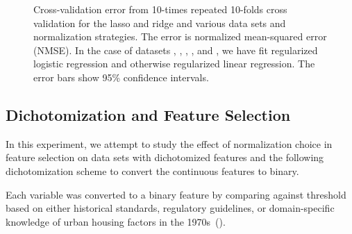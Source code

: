 \begin{figure*}[htpb]
  \centering
  \caption{%
    Cross-validation error from 10-times repeated 10-folds cross validation for the lasso and ridge
    and various data sets and normalization strategies. The error is normalized mean-squared
    error (NMSE). In the case of datasets , , , ,
    and , we have fit regularized logistic regression and
    otherwise regularized linear regression. The error bars show 95\% confidence intervals.
  }
  \label{fig:method-comparison}
\end{figure*}

\subsection{Dichotomization and Feature Selection}
\label{sec:dichotomization}

In this experiment, we attempt to study the effect of normalization choice in feature
selection on data sets with dichotomized features and the following dichotomization scheme
to convert the continuous features to binary.

Each variable was converted to a binary feature by comparing against threshold based on
either historical standards, regulatory guidelines, or domain-specific knowledge of urban
housing factors in the 1970s~().

